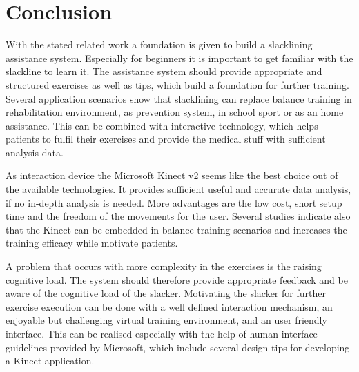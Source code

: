 \section{Conclusion}
With the stated related work a foundation is given to build a slacklining assistance system. Especially for beginners it is important to get familiar with the slackline to learn it. The assistance system should provide appropriate and structured exercises as well as tips, which build a foundation for further training.
Several application scenarios show that slacklining can replace balance training in rehabilitation environment, as prevention system, in school sport or as an home assistance. This can be combined with interactive technology, which helps patients to fulfil their exercises and provide the medical stuff with sufficient analysis data.

As interaction device the Microsoft Kinect v2 seems like the best choice out of the available technologies. It provides sufficient useful and accurate data analysis, if no in-depth analysis is needed. More advantages are the low cost, short setup time and the freedom of the movements for the user. Several studies indicate also that the Kinect can be embedded in balance training scenarios and increases the training efficacy while motivate patients.

A problem that occurs with more complexity in the exercises is the raising cognitive load. The system should therefore provide appropriate feedback and be aware of the cognitive load of the slacker. Motivating the slacker for further exercise execution can be done with a well defined interaction mechanism, an enjoyable but challenging virtual training environment, and an user friendly interface. This can be realised especially with the help of human interface guidelines provided by Microsoft, which include several design tips for developing a Kinect application.
